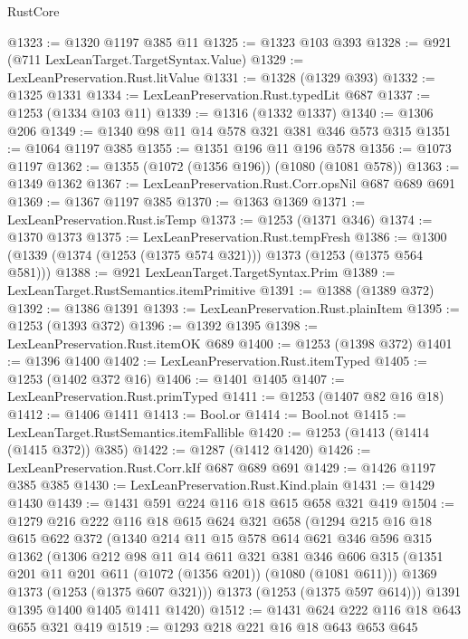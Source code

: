 \begin{lexlean}{RustCore}
\begin{coremodule}
@1323 := @1320 @1197 @385 @11
@1325 := @1323 @103 @393
@1328 := @921 (@711 LexLeanTarget.TargetSyntax.Value)
@1329 := LexLeanPreservation.Rust.litValue
@1331 := @1328 (@1329 @393)
@1332 := @1325 @1331
@1334 := LexLeanPreservation.Rust.typedLit @687
@1337 := @1253 (@1334 @103 @11)
@1339 := @1316 (@1332 @1337)
@1340 := @1306 @206
@1349 := @1340 @98 @11 @14 @578 @321 @381 @346 @573 @315
@1351 := @1064 @1197 @385
@1355 := @1351 @196 @11 @196 @578
@1356 := @1073 @1197
@1362 := @1355 (@1072 (@1356 @196)) (@1080 (@1081 @578))
@1363 := @1349 @1362
@1367 := LexLeanPreservation.Rust.Corr.opsNil @687 @689 @691
@1369 := @1367 @1197 @385
@1370 := @1363 @1369
@1371 := LexLeanPreservation.Rust.isTemp
@1373 := @1253 (@1371 @346)
@1374 := @1370 @1373
@1375 := LexLeanPreservation.Rust.tempFresh
@1386 := @1300 (@1339 (@1374 (@1253 (@1375 @574 @321))) @1373 (@1253 (@1375 @564 @581)))
@1388 := @921 LexLeanTarget.TargetSyntax.Prim
@1389 := LexLeanTarget.RustSemantics.itemPrimitive
@1391 := @1388 (@1389 @372)
@1392 := @1386 @1391
@1393 := LexLeanPreservation.Rust.plainItem
@1395 := @1253 (@1393 @372)
@1396 := @1392 @1395
@1398 := LexLeanPreservation.Rust.itemOK @689
@1400 := @1253 (@1398 @372)
@1401 := @1396 @1400
@1402 := LexLeanPreservation.Rust.itemTyped
@1405 := @1253 (@1402 @372 @16)
@1406 := @1401 @1405
@1407 := LexLeanPreservation.Rust.primTyped
@1411 := @1253 (@1407 @82 @16 @18)
@1412 := @1406 @1411
@1413 := Bool.or
@1414 := Bool.not
@1415 := LexLeanTarget.RustSemantics.itemFallible
@1420 := @1253 (@1413 (@1414 (@1415 @372)) @385)
@1422 := @1287 (@1412 @1420)
@1426 := LexLeanPreservation.Rust.Corr.kIf @687 @689 @691
@1429 := @1426 @1197 @385 @385
@1430 := LexLeanPreservation.Rust.Kind.plain
@1431 := @1429 @1430
@1439 := @1431 @591 @224 @116 @18 @615 @658 @321 @419
@1504 := @1279
    @216
    @222
    @116
    @18
    @615
    @624
    @321
    @658
    (@1294
      @215
      @16
      @18
      @615
      @622
      @372
      (@1340
        @214
        @11
        @15
        @578
        @614
        @621
        @346
        @596
        @315
        @1362
        (@1306
          @212
          @98
          @11
          @14
          @611
          @321
          @381
          @346
          @606
          @315
          (@1351 @201 @11 @201 @611 (@1072 (@1356 @201)) (@1080 (@1081 @611)))
          @1369
          @1373
          (@1253 (@1375 @607 @321)))
        @1373
        (@1253 (@1375 @597 @614)))
      @1391
      @1395
      @1400
      @1405
      @1411
      @1420)
@1512 := @1431 @624 @222 @116 @18 @643 @655 @321 @419
@1519 := @1293 @218 @221 @16 @18 @643 @653 @645

\end{coremodule}
\end{lexlean}
